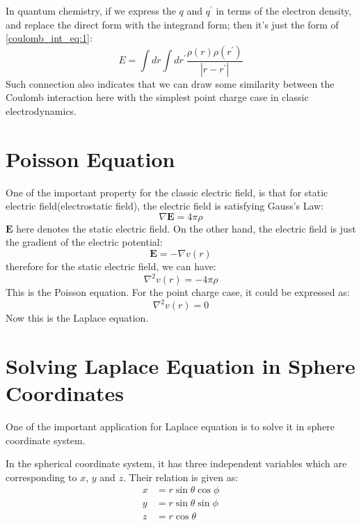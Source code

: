 In quantum chemistry, if we express the $q$ and $q^{'}$ in terms of the electron
density, and replace the direct form with the integrand form;
then it's just the form of \ref{coulomb_int_eq:1}:
\begin{equation}
 E = \int dr \int dr^{'} \frac{\rho(r)\rho(r^{'})}{|r-r^{'}|}
\end{equation}
Such connection also indicates that we can draw some similarity between the
Coulomb interaction here with the simplest point charge case in classic
electrodynamics.

\section{Poisson Equation}
\label{laplace_spherical_electrondynamics:sec}
%
%
%
One of the important property for the classic electric field, is that for static
electric field(electrostatic field), the electric field is satisfying Gauss's Law:
\begin{equation}
 \nabla\bm{E} = 4\pi \rho
\end{equation}
$\bm{E}$ here denotes the static electric field. On the other hand, the electric
field is just the gradient of the electric potential:
\begin{equation}
 \bm{E} = -\nabla v(r)
\end{equation}
therefore for the static electric field, we can have:
\begin{equation}
 \nabla^{2} v(r) = -4\pi \rho
\end{equation}
This is the Poisson equation. For the point charge case, it could be expressed as:
\begin{equation}
\label{coulomb_int_eq:2}
 \nabla^{2} v(r) = 0
\end{equation}
Now this is the Laplace equation.

\section{Solving Laplace Equation in Sphere Coordinates}
%
%
%
One of the important application for Laplace equation is to solve it in
sphere coordinate system.

In the spherical coordinate system, it has three independent variables
which are corresponding to $x$, $y$ and $z$. Their relation is given as:
\begin{align}
 x &= r\sin \theta\cos \phi \nonumber \\
 y &= r\sin \theta\sin \phi \nonumber \\
 z &= r\cos \theta
\end{align}

